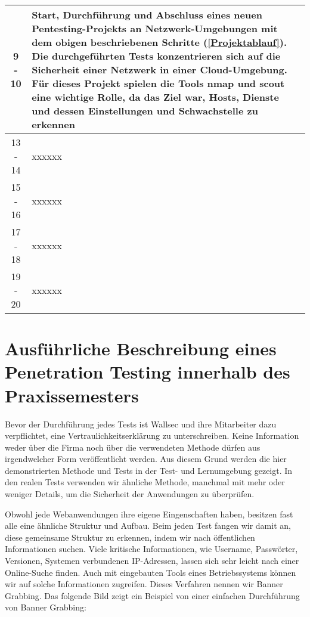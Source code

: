 \begin{table}[H]
\begin{tabularx}{\textwidth}{|c|X|}
    9 - 10      &  Start, Durchführung und Abschluss eines neuen Pentesting-Projekts an Netzwerk-Umgebungen mit dem obigen beschriebenen Schritte (\ref{Projektablauf}). Die durchgeführten Tests konzentrieren sich auf die Sicherheit einer Netzwerk in einer Cloud-Umgebung. Für dieses Projekt spielen die Tools \gls{nmap} und \gls{scout} eine wichtige Rolle, da das Ziel war, Hosts, Dienste und dessen Einstellungen und \gls{Schwachstelle} zu erkennen \\

    \hline

    13 - 14      &  xxxxxx \\

    \hline

    15 - 16      &  xxxxxx \\


    \hline

    17 - 18      &  xxxxxx \\

    \hline

    19 - 20      &  xxxxxx \\


       \bottomrule
    \end{tabularx}
\end{table}

\section{Ausführliche Beschreibung eines Penetration Testing innerhalb des Praxissemesters}

Bevor der Durchführung jedes Tests ist Wallsec und ihre Mitarbeiter dazu verpflichtet, eine Vertraulichkeitserklärung zu unterschreiben. Keine Information weder über die Firma noch über die verwendeten Methode dürfen aus irgendwelcher Form veröffentlicht werden. Aus diesem Grund werden die hier demonstrierten Methode und Tests in der Test- und Lernumgebung  gezeigt. In den realen Tests verwenden wir ähnliche Methode, manchmal mit mehr oder weniger Details, um die Sicherheit der Anwendungen zu überprüfen. 

Obwohl jede Webanwendungen ihre eigene Eingenschaften haben, besitzen fast alle eine ähnliche Struktur und Aufbau. Beim jeden Test fangen wir damit an, diese gemeinsame Struktur zu erkennen, indem wir nach öffentlichen Informationen suchen. Viele kritische Informationen, wie Username, Passwörter, Versionen, Systemen verbundenen IP-Adressen, lassen sich sehr leicht nach einer Online-Suche finden. Auch mit eingebauten Tools eines Betriebssystems können wir auf solche Informationen zugreifen. Dieses Verfahren nennen wir Banner Grabbing. Das folgende Bild zeigt ein Beispiel von einer einfachen Durchführung von Banner Grabbing:

